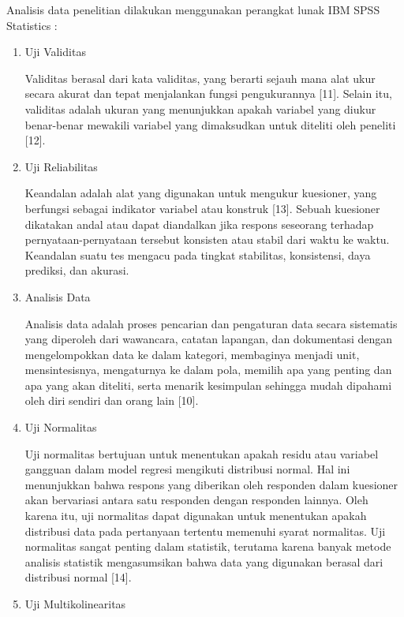     Analisis data penelitian dilakukan menggunakan perangkat lunak IBM SPSS Statistics :

    \begin{enumerate}
        \item Uji Validitas
        
        Validitas berasal dari kata validitas, yang berarti sejauh mana alat ukur secara akurat dan tepat menjalankan fungsi pengukurannya [11]. Selain itu, validitas adalah ukuran yang menunjukkan apakah variabel yang diukur benar-benar mewakili variabel yang dimaksudkan untuk diteliti oleh peneliti [12].
        
        \item Uji Reliabilitas
        
        Keandalan adalah alat yang digunakan untuk mengukur kuesioner, yang berfungsi sebagai indikator variabel atau konstruk [13]. Sebuah kuesioner dikatakan andal atau dapat diandalkan jika respons seseorang terhadap pernyataan-pernyataan tersebut konsisten atau stabil dari waktu ke waktu. Keandalan suatu tes mengacu pada tingkat stabilitas, konsistensi, daya prediksi, dan akurasi.

        \item Analisis Data

        Analisis data adalah proses pencarian dan pengaturan data secara sistematis yang diperoleh dari wawancara, catatan lapangan, dan dokumentasi dengan mengelompokkan data ke dalam kategori, membaginya menjadi unit, mensintesisnya, mengaturnya ke dalam pola, memilih apa yang penting dan apa yang akan diteliti, serta menarik kesimpulan sehingga mudah dipahami oleh diri sendiri dan orang lain [10].

        \item Uji Normalitas

        Uji normalitas bertujuan untuk menentukan apakah residu atau variabel gangguan dalam model regresi mengikuti distribusi normal. Hal ini menunjukkan bahwa respons yang diberikan oleh responden dalam kuesioner akan bervariasi antara satu responden dengan responden lainnya. Oleh karena itu, uji normalitas dapat digunakan untuk menentukan apakah distribusi data pada pertanyaan tertentu memenuhi syarat normalitas. Uji normalitas sangat penting dalam statistik, terutama karena banyak metode analisis statistik mengasumsikan bahwa data yang digunakan berasal dari distribusi normal [14].

        \item Uji Multikolinearitas


\end{enumerate}
